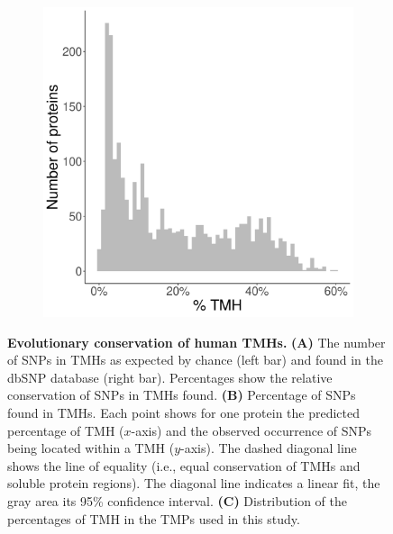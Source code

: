 \begin{figure}[!htbp]
   \vfill

  \begin{subfigure}[t]{0.45\textwidth}
    \centering
    \caption{}
    \includegraphics[width=\linewidth]{ncbi_peregrine_results/fig_f_tmh_ncbi.png}
    \label{fig:f_tmh_ncbi}
  \end{subfigure}  


  \caption{ \textbf{Evolutionary conservation of human TMHs.}
    \textbf{(A)} 
    The number of SNPs in TMHs as expected by chance (left bar) 
    and found in the dbSNP database (right bar).
    Percentages show the relative conservation
    of SNPs in TMHs found.
    \textbf{(B)}
    Percentage of SNPs found in TMHs.
    Each point shows for one protein the predicted percentage of
    TMH ($x$-axis) and the observed occurrence of SNPs being located
    within a TMH ($y$-axis).
    The dashed diagonal line shows the line of equality (i.e.,
    equal conservation of TMHs and soluble protein regions). 
    The diagonal line indicates a linear fit, the gray area its 95\% confidence interval.
    \textbf{(C)}
    Distribution of the percentages of TMH in the TMPs used in this study.
  }
\end{figure}

\clearpage

\thispagestyle{empty}

